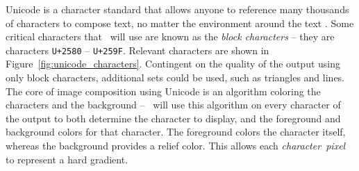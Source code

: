 Unicode is a character standard that allows anyone to reference many thousands of characters to compose text, no matter the environment around the text \cite{unicode}.
Some critical characters that \name\ will use are known as the {\it block characters} -- they are characters \texttt{U+2580} -- \texttt{U+259F}.
Relevant characters are shown in Figure~\ref{fig:unicode_characters}.
Contingent on the quality of the output using only block characters, additional sets could be used, such as triangles and lines.
The core of image composition using Unicode is an algorithm coloring the characters and the background -- \name\ will use this algorithm on every character of the output to both determine the character to display, and the foreground and background colors for that character.
The foreground colors the character itself, whereas the background provides a relief color.
This allows each {\it character~pixel} to represent a hard gradient.


